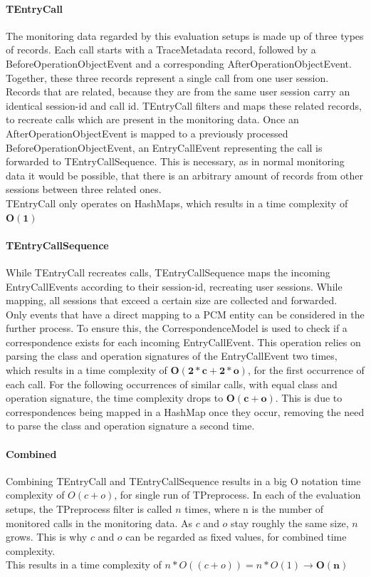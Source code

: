 \documentclass[10pt,a4paper]{article}
\begin{document}
	\paragraph{TEntryCall}
	The monitoring data regarded by this evaluation setups is made up of three types of records. Each call starts with a TraceMetadata record, followed by a BeforeOperationObjectEvent and a corresponding AfterOperationObjectEvent. Together, these three records represent a single call from one user session. Records that are related, because they are from the same user session carry an identical session-id and call id. TEntryCall filters and maps these related records, to recreate calls which are present in the monitoring data. Once an AfterOperationObjectEvent is mapped to a previously processed BeforeOperationObjectEvent, an EntryCallEvent representing the call is forwarded to TEntryCallSequence. This is necessary, as in normal monitoring data it would be possible, that there is an arbitrary amount of records from other sessions between three related ones.\\
	TEntryCall only operates on HashMaps, which results in a time complexity of $\mathbf{O(1)}$
	
	\paragraph{TEntryCallSequence}
	While TEntryCall recreates calls, TEntryCallSequence maps the incoming EntryCallEvents according to their session-id, recreating user sessions. While mapping, all sessions that exceed a certain size are collected and forwarded. \\
	Only events that have a direct mapping to a PCM entity can be considered in the further process. To ensure this, the CorrespondenceModel is used to check if a correspondence exists for each incoming EntryCallEvent. This operation relies on parsing the class and operation signatures of the EntryCallEvent two times, which results in a time complexity of $\mathbf{O(2 * c + 2 * o)}$, for the first occurrence of each call. For the following occurrences of similar calls, with equal class and operation signature, the time complexity drops to $\mathbf{O(c + o)}$. This is due to correspondences being mapped in a HashMap once they occur, removing the need to parse the class and operation signature a second time.
	
	\paragraph{Combined}
	Combining TEntryCall and TEntryCallSequence results in a big O notation time complexity of $O(c + o)$, for single run of TPreprocess. In each of the evaluation setups, the TPreprocess filter is called $n$ times, where n is the number of monitored calls in the monitoring data. As $c$ and $o$ stay roughly the same size, $n$ grows. This is why $c$ and $o$ can be regarded as fixed values, for combined time complexity.\\
	This results in a time complexity of $n * O((c + o)) = n * O(1) \rightarrow \mathbf{O(n)}$
	
\end{document}
